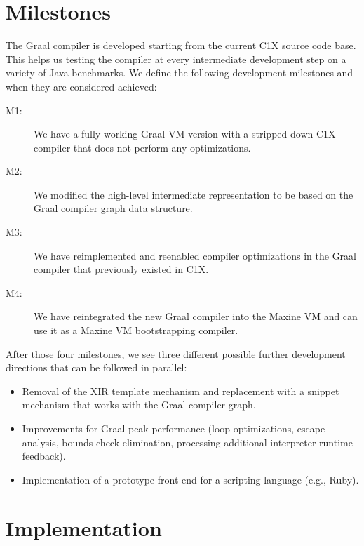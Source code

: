 \documentclass[twocolumn]{svjour3}
\begin{document}
\section{Milestones}
The Graal compiler is developed starting from the current C1X source code base.
This helps us testing the compiler at every intermediate development step on a variety of Java benchmarks.
We define the following development milestones and when they are considered achieved:
\begin{description}
\item[M1:] We have a fully working Graal VM version with a stripped down C1X compiler that does not perform any optimizations.
\item[M2:] We modified the high-level intermediate representation to be based on the Graal compiler graph data structure.
\item[M3:] We have reimplemented and reenabled compiler optimizations in the Graal compiler that previously existed in C1X.
\item[M4:] We have reintegrated the new Graal compiler into the Maxine VM and can use it as a Maxine VM bootstrapping compiler.
\end{description}

After those four milestones, we see three different possible further development directions that can be followed in parallel:
\begin{itemize}
  \item Removal of the XIR template mechanism and replacement with a snippet mechanism that works with the Graal compiler graph.
  \item Improvements for Graal peak performance (loop optimizations, escape analysis, bounds check elimination, processing additional interpreter runtime feedback).
  \item Implementation of a prototype front-end for a scripting language (e.g., Ruby).
\end{itemize}

\section{Implementation}
\end{document}
